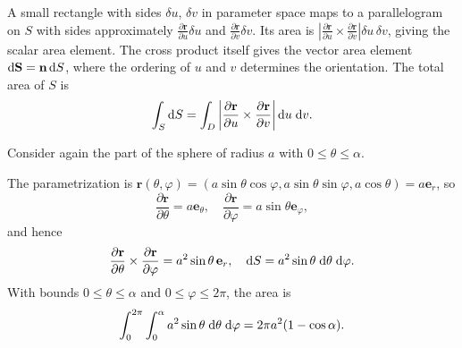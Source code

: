 \documentclass[a4paper]{article}
\begin{document}
\begin{rmk}
  A small rectangle with sides $\delta u$, $\delta v$ in parameter space maps to a parallelogram on $S$ with sides approximately $\frac{\partial \mathbf{r}}{\partial u} \delta u$ and $\frac{\partial \mathbf{r}}{\partial v} \delta v$. Its area is $\left|\frac{\partial \mathbf{r}}{\partial u} \times \frac{\partial \mathbf{r}}{\partial v}\right| \delta u\, \delta v$, giving the scalar area element. The cross product itself gives the vector area element $\mathrm{d}\mathbf{S} = \mathbf{n}\,\mathrm{d} S$, where the ordering of $u$ and $v$ determines the orientation. The total area of $S$ is
  \[
    \int_S \mathrm{d} S = \int_D \left|\frac{\partial \mathbf{r}}{\partial u}\times \frac{\partial \mathbf{r}}{\partial v}\right| \mathrm{d} u\;\mathrm{d} v.
  \]
\end{rmk}
\begin{eg}
  Consider again the part of the sphere of radius $a$ with $0 \leq \theta \leq \alpha$.
  \begin{center}
  \end{center}
  The parametrization is $\mathbf{r}(\theta, \varphi) = (a\sin \theta\cos\varphi, a\sin \theta\sin \varphi, a\cos \theta) = a\mathbf{e}_r$, so
  \[
    \frac{\partial \mathbf{r}}{\partial \theta} = a\mathbf{e}_\theta, \quad \frac{\partial \mathbf{r}}{\partial \varphi} = a\sin \theta \mathbf{e}_\varphi,
  \]
  and hence
  \[
    \frac{\partial \mathbf{r}}{\partial \theta}\times \frac{\partial \mathbf{r}}{\partial \varphi} = a^2\sin \theta\, \mathbf{e}_r, \quad \mathrm{d} S = a^2\sin \theta\;\mathrm{d} \theta\;\mathrm{d} \varphi.
  \]
  With bounds $0 \leq \theta \leq \alpha$ and $0 \leq \varphi \leq 2\pi$, the area is
  \[
    \int_0^{2\pi}\int_0^{\alpha} a^2\sin \theta\;\mathrm{d} \theta \;\mathrm{d} \varphi = 2\pi a^2(1 - \cos\alpha).
  \]
\end{eg}
\end{document}
